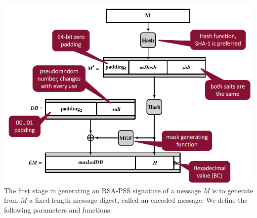 \documentclass[12pt]{article}
\begin{document}
 \includegraphics[width=\linewidth]{./slides/L4P5RSAPSSENC.png}\\
 The first stage in generating an RSA-PSS signature of a message $M$ is to generate from $M$ a fixed-length message digest, called an encoded message. We define the following parameters and functions:
\end{document}
